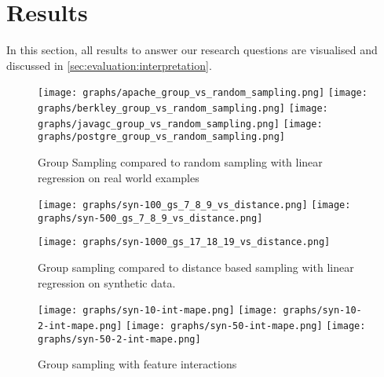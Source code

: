 \documentclass[../../thesis.tex]{subfiles}
\begin{document}
\section{Results}
In this section, all results to answer our research questions are visualised and 
discussed in \autoref{sec:evaluation:interpretation}.


\begin{figure}[!htbp]
    \texttt{[image: graphs/apache\_group\_vs\_random\_sampling.png]}
    \texttt{[image: graphs/berkley\_group\_vs\_random\_sampling.png]}
    \texttt{[image: graphs/javagc\_group\_vs\_random\_sampling.png]} 
    \texttt{[image: graphs/postgre\_group\_vs\_random\_sampling.png]}
    \caption[Group sampling and random sampling on real world examples]{
        Group Sampling compared to random sampling with linear regression on real world examples
    }\label{fig:evaluation:mape_real}
\end{figure}

\begin{figure}[!htbp]
    \texttt{[image: graphs/syn-100\_gs\_7\_8\_9\_vs\_distance.png]}
    \texttt{[image: graphs/syn-500\_gs\_7\_8\_9\_vs\_distance.png]}
    \begin{center}
        \texttt{[image: graphs/syn-1000\_gs\_17\_18\_19\_vs\_distance.png]}
    \end{center}
    \caption[Group sampling and random sampling on synthetic datasets]{
        Group sampling compared to distance based sampling with linear regression on synthetic data.
    }\label{fig:evaluation:mape_syn}
\end{figure}




\begin{figure}[!htbp]
    \texttt{[image: graphs/syn-10-int-mape.png]}
    \texttt{[image: graphs/syn-10-2-int-mape.png]}
    \texttt{[image: graphs/syn-50-int-mape.png]}
    \texttt{[image: graphs/syn-50-2-int-mape.png]}
    \caption[Group sampling with feature interactions]{
        Group sampling with feature interactions
    }\label{fig:evaluation:interactions}
\end{figure}

\FloatBarrier
\end{document}
